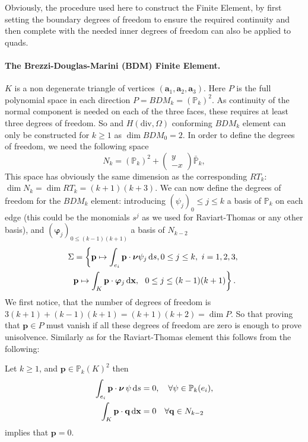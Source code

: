 \begin{remark}
Obviously, the procedure used here to construct the Finite Element, by first setting the boundary degrees of freedom to ensure the required continuity and then complete with the needed inner degrees of freedom can also be applied to quads.
\end{remark}




\paragraph{The Brezzi-Douglas-Marini (BDM) Finite Element.}
$K$ is a non degenerate triangle of vertices $ (\mathbf{a}_1, \mathbf{a}_2, \mathbf{a}_3)$. 
Here $P$ is the full polynomial space in each direction $P = BDM_k = (\mathbb{P}_k)^2 $. As continuity of the normal component is needed on each of the three faces, these requires at least three degrees of freedom. So and $ H(\textrm{div}, \Omega)$ conforming $BDM_k$ element can only be constructed for $k\geq 1$ as $\dim BDM_0=2$. In order to define the degrees of freedom, we need the following space
$$N_k = (\mathbb{P}_k)^2 + \begin{pmatrix} y\\ -x \end{pmatrix} \bar{ \mathbb{P}}_k, $$
This space has obviously the same dimension as the corresponding $RT_k$: $\dim N_k=\dim RT_k=(k+1)(k+3)$.
We can now define the degrees of freedom for the $BDM_k$ element:
introducing $(\psi_j)_0\leq j\leq k$ a basis of $ \mathbb{P}_k$ on each edge (this could be the monomials $s^j$ as we used for Raviart-Thomas or any other basis), and $(\boldsymbol{\varphi}_j)_{0\leq (k-1)(k+1)}$ a basis of $N_{k-2}$
\begin{multline*}
\Sigma=\left\{ \mathbf{p}\mapsto\int_{e_i} \mathbf{p}\cdot \boldsymbol{\nu} \psi_j\,{\rm d} s, 0\leq j\leq k,~i=1,2,3, \right.\\ \left.
\mathbf{p}\mapsto\int_K \mathbf{p} \cdot \boldsymbol{\varphi}_j \,{\rm d} \mathbf{x} , ~~ 0\leq j\leq  (k-1)(k+1) \right\}.
\end{multline*}
We first notice, that the number of degrees of freedom is $3(k+1) + (k-1)(k+1)=(k+1)(k+2)=\dim P$. So that proving that  $ \mathbf{p}\in P$ must vanish if all these degrees of freedom are zero is enough to prove unisolvence. Similarly as for the Raviart-Thomas element this follows from the following:
\begin{lemma} Let $k\geq 1$, and $ \mathbf{p}\in \mathbb{P}_k(K)^2$ then
\begin{align}
\int_{e_i} \mathbf{p}\cdot \boldsymbol{\nu} \,\psi \,{\rm d} s &=0, \quad \forall \psi\in \mathbb{P}_k(e_i), \label{eq:BDMe}\\
\int_K \mathbf{p}  \cdot \mathbf{q}\,{\rm d} \mathbf{x} &=0 \quad\forall \mathbf{q}\in N_{k-2}
\label{eq:BDMf}
\end{align}
implies that $ \mathbf{p}=0$.
\end{lemma}

